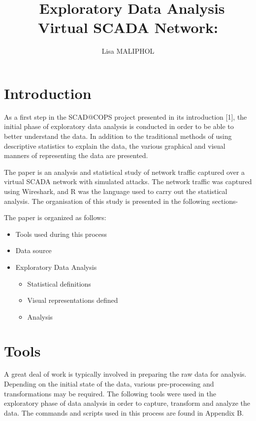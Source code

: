 \documentclass[]{article}
\title{~Exploratory Data Analysis\\Virtual SCADA Network:}
\author{Lisa MALIPHOL}
\date{}
\begin{document}
\maketitle


\section{Introduction}\label{introduction}

As a first step in the SCAD@COPS project presented in its introduction
{[}1{]}, the initial phase of exploratory data analysis is conducted in
order to be able to better understand the data. In addition to the
traditional methods of using descriptive statistics to explain the data,
the various graphical and visual manners of representing the data are
presented.

The paper is an analysis and statistical study of network traffic
captured over a virtual SCADA network with simulated attacks. The
network traffic was captured using Wireshark, and R was the language
used to carry out the statistical analysis. The organisation of this
study is presented in the following sections-

The paper is organized as follows:

\begin{itemize}
\itemsep1pt\parskip0pt
\item
  Tools used during this process
\item
  Data source
\item
  Exploratory Data Analysis

  \begin{itemize}
  \itemsep1pt\parskip0pt
  \item
    Statistical definitions
  \item
    Visual representations defined
  \item
    Analysis
  \end{itemize}
\end{itemize}

\section{Tools}\label{tools}

A great deal of work is typically involved in preparing the raw data for
analysis. Depending on the initial state of the data, various
pre-processing and transformations may be required. The following tools
were used in the exploratory phase of data analysis in order to capture,
transform and analyze the data. The commands and scripts used in this
process are found in Appendix B.
\end{document}
